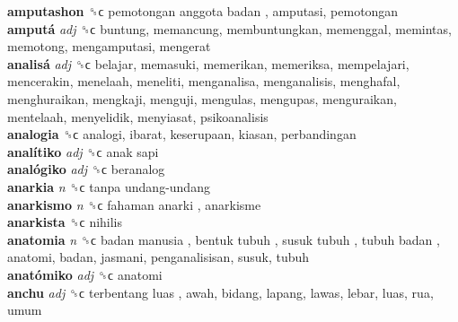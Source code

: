 \textbf{amputashon} ␝ϲ   pemotongan anggota badan , amputasi, pemotongan  \\
\textbf{amputá} \emph{adj}  ␝ϲ  buntung, memancung, membuntungkan, memenggal, memintas, memotong, mengamputasi, mengerat  \\
\textbf{analisá} \emph{adj}  ␝ϲ  belajar, memasuki, memerikan, memeriksa, mempelajari, mencerakin, menelaah, meneliti, menganalisa, menganalisis, menghafal, menghuraikan, mengkaji, menguji, mengulas, mengupas, menguraikan, mentelaah, menyelidik, menyiasat, psikoanalisis  \\
\textbf{analogia} ␝ϲ  analogi, ibarat, keserupaan, kiasan, perbandingan  \\
\textbf{analítiko} \emph{adj}  ␝ϲ   anak sapi   \\
\textbf{analógiko} \emph{adj}  ␝ϲ  beranalog  \\
\textbf{anarkia} \emph{n}  ␝ϲ   tanpa undang-undang   \\
\textbf{anarkismo} \emph{n}  ␝ϲ   fahaman anarki , anarkisme  \\
\textbf{anarkista} ␝ϲ  nihilis  \\
\textbf{anatomia} \emph{n}  ␝ϲ   badan manusia ,  bentuk tubuh ,  susuk tubuh ,  tubuh badan , anatomi, badan, jasmani, penganalisisan, susuk, tubuh  \\
\textbf{anatómiko} \emph{adj}  ␝ϲ  anatomi  \\
\textbf{anchu} \emph{adj}  ␝ϲ   terbentang luas , awah, bidang, lapang, lawas, lebar, luas, rua, umum  \\
